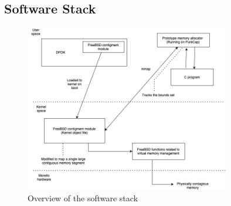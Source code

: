 \documentclass[acmsmall,screen,review]{acmart}
\begin{document}


\subsection{Software Stack}
\begin{figure}[h]
\includegraphics[width=0.8\textwidth]{diagrams/SoftwareStack24.png}
\caption{Overview of the software stack}
\label{fig:SoftwareStack}
\end{figure}

\end{document}
